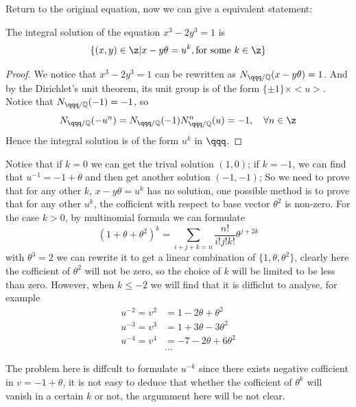 Return to the original equation, now we can give a equivalent statement:
\begin{proposition}
    The integral solution of the equation \(x^3-2y^3=1\) is
    \[\{(x,y)\in \z| x-y\theta = u^k, \text{for some } k \in \z\}\]

    \begin{proof}
        We notice that \(x^3-2y^3 = 1 \) can be rewritten as \(N_{\qqq / \qq}(x-y\theta) = 1\). And by the Dirichlet's unit theorem, its unit group is of the form \(\{\pm 1\} \times <u>\). Notice that \(N_{\qqq / \qq}(-1) = -1\), so
        \[N_{\qqq / \qq}(-u^n) = N_{\qqq / \qq}(-1)N_{\qqq / \qq}^n(u) = -1, \quad \forall n \in \z \]
        Hence the integral solution is of the form \(u^k\) in \(\qqq\).
    \end{proof}
\end{proposition}

Notice that if \(k=0\) we can get the trival solution \((1,0)\); if \(k=-1\), we can find that \(u^{-1} = -1 + \theta\) and then get another solution \((-1,-1)\); So we need to prove that for any other \(k\), \(x-y\theta = u^k\) has no solution, one possible method is to prove that for any other \(u^k\), the cofficient with respect to base vector \(\theta^2\) is non-zero. For the case \(k>0\), by multinomial formula we can formulate
\[(1+\theta+ \theta^2)^k = \sum_{i+j+k=n} \frac{n!}{i!j!k!}\theta ^{j+2k}\]
with \(\theta ^3= 2\) we can rewrite it to get a linear combination of \(\{1,\theta,\theta ^2\}\), clearly here the cofficient of \(\theta ^2\) will not be zero, so the choice of \(k\) will be limited to be less than zero. However, when \(k\leq -2\) we will find that it is difficlut to analyse, for example
\begin{align*}
    u^{-2} = v^2 &= 1- 2\theta +\theta^2 \\
    u^{-3} = v^3 &= 1+3\theta-3\theta^2 \\
    u^{-4} = v^4 &= -7-2\theta+6\theta^2\\
    &...
\end{align*}

The problem here is diffcult to formulate \(u^{-k}\) since there exists negative cofficient in \(v=-1+\theta\), it is not easy to deduce that whether the cofficient of \(\theta^k\) will vanish in a certain \(k\) or not, the argumment here will be not clear.
